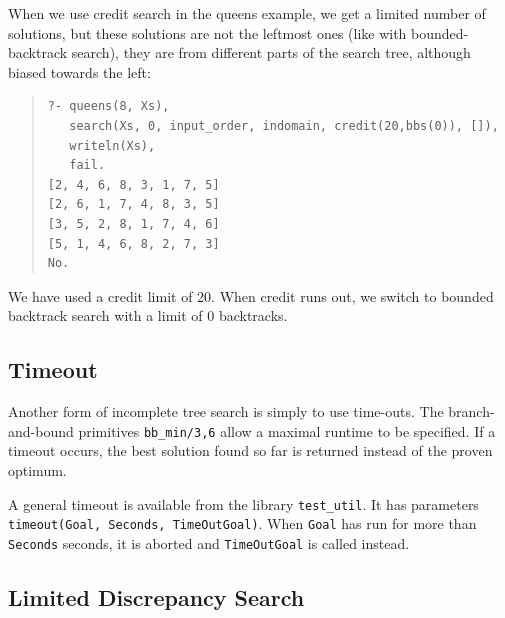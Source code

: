 When we use credit search in the queens example, we get a limited number
of solutions, but these solutions are not the leftmost ones (like with
bounded-backtrack search), they are
from different parts of the search tree, although biased towards the left:
\begin{quote}\begin{verbatim}
?- queens(8, Xs),
   search(Xs, 0, input_order, indomain, credit(20,bbs(0)), []),
   writeln(Xs),
   fail.
[2, 4, 6, 8, 3, 1, 7, 5]
[2, 6, 1, 7, 4, 8, 3, 5]
[3, 5, 2, 8, 1, 7, 4, 6]
[5, 1, 4, 6, 8, 2, 7, 3]
No.
\end{verbatim}\end{quote}
We have used a credit limit of 20. When credit runs out, we switch to
bounded backtrack search with a limit of 0 backtracks.



\subsection{Timeout}

Another form of incomplete tree search is simply to use time-outs.
The branch-and-bound primitives {\tt bb_min/3,6} allow
a maximal runtime to be specified. If a timeout occurs, the best solution
found so far is returned instead of the proven optimum.

A general timeout is available from the library {\tt test_util}.
It has parameters {\tt timeout(Goal, Seconds, TimeOutGoal)}.
When {\tt Goal} has run for
more than {\tt Seconds} seconds, it is aborted and {\tt TimeOutGoal}
is called instead. 

\subsection{Limited Discrepancy Search}


